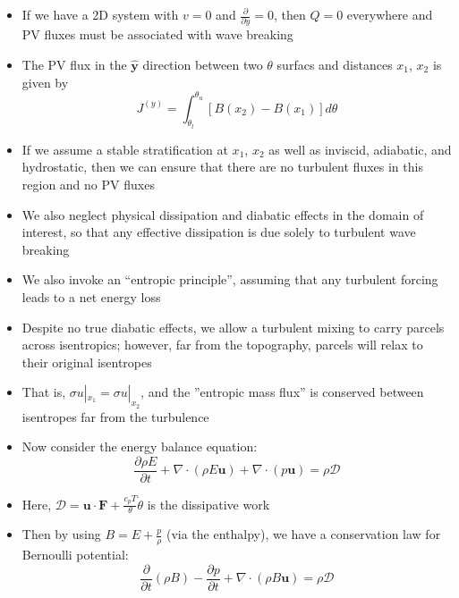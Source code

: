 \documentclass[30pt,landscape]{foils}
\newcommand{\pdiff}[2]{\frac{\partial #1}{\partial #2}}
\begin{document}
\begin{itemize}
  \item If we have a 2D system with $v = 0$ and $\pdiff{}{y} = 0$, then $Q = 0$ everywhere and PV fluxes must be associated with wave breaking

  \item The PV flux in the $\hat{\bm{y}}$ direction between two $\theta$ surfacs and distances $x_1$, $x_2$ is given by
  \begin{equation*}
    J^{(y)} = \int_{\theta_l}^{\theta_u} \left[B(x_2) - B(x_1)\right]d\theta
  \end{equation*}

  \item If we assume a stable stratification at $x_1$, $x_2$ as well as inviscid, adiabatic, and hydrostatic, then we can ensure that there are no turbulent fluxes in this region and no PV fluxes

  \item We also neglect physical dissipation and diabatic effects in the domain of interest, so that any effective dissipation is due solely to turbulent wave breaking

  \item We also invoke an ``entropic principle'', assuming that any turbulent forcing leads to a net energy loss

  \item Despite no true diabatic effects, we allow a turbulent mixing to carry parcels across isentropics; however, far from the topography, parcels will relax to their original isentropes

  \item That is, $\sigma u|_{x_1} = \sigma u|_{x_2}$, and the ''entropic mass flux'' is conserved between isentropes far from the turbulence

  \item Now consider the energy balance equation:
  \begin{equation*}
    \pdiff{\rho E}{t} + \nabla \cdot \left(\rho E \bm{u} \right) + \nabla \cdot \left(p \bm{u} \right) = \rho \mathcal{D}
  \end{equation*}

  \item Here, $\mathcal{D} = \bm{u} \cdot \bm{F} + \frac{c_p T}{\theta} \dot{\theta}$ is the dissipative work

  \item Then by using $B = E + \frac{p}{\rho}$ (via the enthalpy), we have a conservation law for Bernoulli potential:
  \begin{equation*}
    \pdiff{}{t}\left(\rho B\right) - \pdiff{p}{t} + \nabla \cdot \left(\rho B \bm{u}\right) = \rho \mathcal{D}
  \end{equation*}


\end{itemize}
\end{document}

